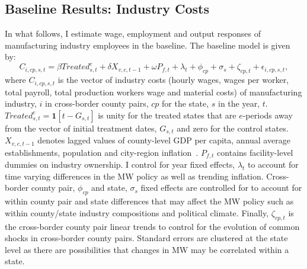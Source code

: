 \documentclass[12pt, english]{article}
\begin{document}
    \subsection{Baseline Results: Industry Costs}\label{subsec:baseline-results-industry-costs}
    In what follows, I estimate wage, employment and output responses of manufacturing industry employees in the baseline. The baseline model is given by:
    \begin{equation}
        C_{i,cp,s,t} = \beta Treated_{s,t}^e + \delta X_{v,c,t-1} + \omega P_{f,t} + \lambda_{t} + \phi_{cp} + \sigma_{s} + \zeta_{cp,t} + \epsilon_{i,cp,s,t},\label{eq:baseline-wages}
    \end{equation}
    where $C_{i,cp,s,t}$ is the vector of industry costs (hourly wages, wages per worker, total payroll, total production workers wage and material costs) of manufacturing industry, $i$ in cross-border county pairs, $cp$ for the state, $s$ in the year, $t$. $Treated_{s,t}^e = \textbf{1}[t - G_{s,t}]$ is unity for the treated states that are $e$-periods away from the vector of initial treatment dates, $G_{s,t}$ and zero for the control states. $X_{v,c,t-1}$ denotes lagged values of county-level GDP per capita, annual average establishments, population and city-region inflation~\parencite{gopalan2021state, dube2010minimum, clemens2019making}. $P_{f,t}$ contains facility-level dummies on industry ownership. I control for year fixed effects, $\lambda_{t}$ to account for time varying differences in the MW policy as well as trending inflation. Cross-border county pair, $\phi_{cp}$ and state, $\sigma_{s}$ fixed effects are controlled for to account for within county pair and state differences that may affect the MW policy such as within county/state industry compositions and political climate. Finally, $\zeta_{cp,t}$ is the cross-border county pair linear trends to control for the evolution of common shocks in cross-border county pairs. Standard errors are clustered at the state level as there are possibilities that changes in MW may be correlated within a state.
    
\end{document}
